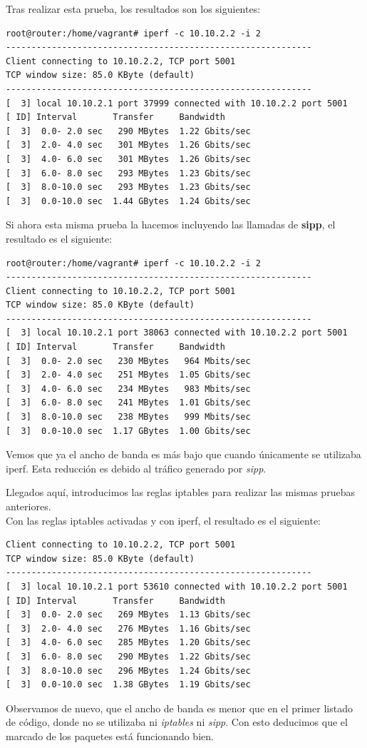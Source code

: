 \documentclass[11pt]{article}
\begin{document}
Tras realizar esta prueba, los resultados son los siguientes:

\begin{lstlisting}[style=C,numbers=none]
root@router:/home/vagrant# iperf -c 10.10.2.2 -i 2
------------------------------------------------------------
Client connecting to 10.10.2.2, TCP port 5001
TCP window size: 85.0 KByte (default)
------------------------------------------------------------
[  3] local 10.10.2.1 port 37999 connected with 10.10.2.2 port 5001
[ ID] Interval       Transfer     Bandwidth
[  3]  0.0- 2.0 sec   290 MBytes  1.22 Gbits/sec
[  3]  2.0- 4.0 sec   301 MBytes  1.26 Gbits/sec
[  3]  4.0- 6.0 sec   301 MBytes  1.26 Gbits/sec
[  3]  6.0- 8.0 sec   293 MBytes  1.23 Gbits/sec
[  3]  8.0-10.0 sec   293 MBytes  1.23 Gbits/sec
[  3]  0.0-10.0 sec  1.44 GBytes  1.24 Gbits/sec
\end{lstlisting}

Si ahora esta misma prueba la hacemos incluyendo las llamadas de \textbf{sipp}, el resultado es el siguiente:

\begin{lstlisting}[style=C,numbers=none]
root@router:/home/vagrant# iperf -c 10.10.2.2 -i 2
------------------------------------------------------------
Client connecting to 10.10.2.2, TCP port 5001
TCP window size: 85.0 KByte (default)
------------------------------------------------------------
[  3] local 10.10.2.1 port 38063 connected with 10.10.2.2 port 5001
[ ID] Interval       Transfer     Bandwidth
[  3]  0.0- 2.0 sec   230 MBytes   964 Mbits/sec
[  3]  2.0- 4.0 sec   251 MBytes  1.05 Gbits/sec
[  3]  4.0- 6.0 sec   234 MBytes   983 Mbits/sec
[  3]  6.0- 8.0 sec   241 MBytes  1.01 Gbits/sec
[  3]  8.0-10.0 sec   238 MBytes   999 Mbits/sec
[  3]  0.0-10.0 sec  1.17 GBytes  1.00 Gbits/sec
\end{lstlisting}

Vemos que ya el ancho de banda es más bajo que cuando únicamente se utilizaba iperf. Esta reducción es debido al tráfico generado por \textit{sipp}.

Llegados aquí, introducimos las reglas iptables para realizar las mismas pruebas anteriores.\\
Con las reglas iptables activadas y con iperf, el resultado es el siguiente:
\begin{lstlisting}[style=C,numbers=none]
Client connecting to 10.10.2.2, TCP port 5001
TCP window size: 85.0 KByte (default)
------------------------------------------------------------
[  3] local 10.10.2.1 port 53610 connected with 10.10.2.2 port 5001
[ ID] Interval       Transfer     Bandwidth
[  3]  0.0- 2.0 sec   269 MBytes  1.13 Gbits/sec
[  3]  2.0- 4.0 sec   276 MBytes  1.16 Gbits/sec
[  3]  4.0- 6.0 sec   285 MBytes  1.20 Gbits/sec
[  3]  6.0- 8.0 sec   290 MBytes  1.22 Gbits/sec
[  3]  8.0-10.0 sec   296 MBytes  1.24 Gbits/sec
[  3]  0.0-10.0 sec  1.38 GBytes  1.19 Gbits/sec
\end{lstlisting}
Observamos de nuevo, que el ancho de banda es menor que en el primer listado de código, donde no se utilizaba ni \textit{iptables} ni \textit{sipp}. Con esto deducimos que el marcado de los paquetes está funcionando bien. \\
\end{document}
